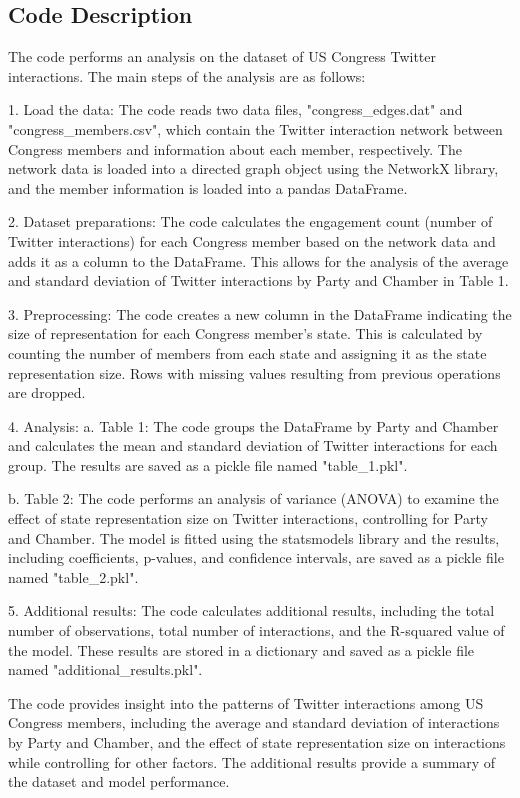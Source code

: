 \documentclass[11pt]{article}
\begin{document}
\subsection{Code Description}

The code performs an analysis on the dataset of US Congress Twitter interactions. The main steps of the analysis are as follows:

1. Load the data: The code reads two data files, "congress\_edges.dat" and "congress\_members.csv", which contain the Twitter interaction network between Congress members and information about each member, respectively. The network data is loaded into a directed graph object using the NetworkX library, and the member information is loaded into a pandas DataFrame.

2. Dataset preparations: The code calculates the engagement count (number of Twitter interactions) for each Congress member based on the network data and adds it as a column to the DataFrame. This allows for the analysis of the average and standard deviation of Twitter interactions by Party and Chamber in Table 1.

3. Preprocessing: The code creates a new column in the DataFrame indicating the size of representation for each Congress member's state. This is calculated by counting the number of members from each state and assigning it as the state representation size. Rows with missing values resulting from previous operations are dropped.

4. Analysis:
   a. Table 1: The code groups the DataFrame by Party and Chamber and calculates the mean and standard deviation of Twitter interactions for each group. The results are saved as a pickle file named "table\_1.pkl".
   
   b. Table 2: The code performs an analysis of variance (ANOVA) to examine the effect of state representation size on Twitter interactions, controlling for Party and Chamber. The model is fitted using the statsmodels library and the results, including coefficients, p-values, and confidence intervals, are saved as a pickle file named "table\_2.pkl".
   
5. Additional results: The code calculates additional results, including the total number of observations, total number of interactions, and the R-squared value of the model. These results are stored in a dictionary and saved as a pickle file named "additional\_results.pkl".

The code provides insight into the patterns of Twitter interactions among US Congress members, including the average and standard deviation of interactions by Party and Chamber, and the effect of state representation size on interactions while controlling for other factors. The additional results provide a summary of the dataset and model performance.
\end{document}
